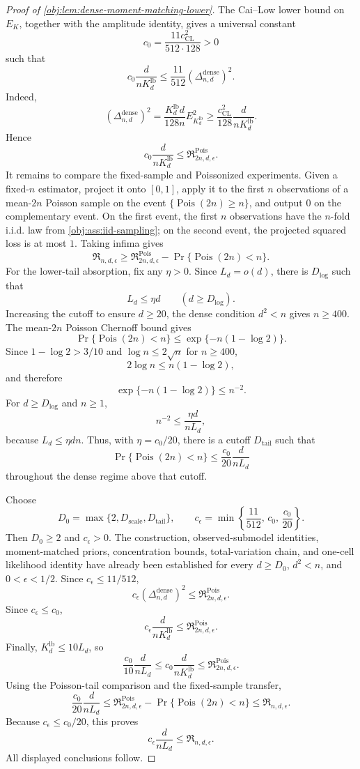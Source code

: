 \documentclass[11pt]{article}
\begin{document}
\begin{proof}[Proof of \cref{obj:lem:dense-moment-matching-lower}]
The Cai--Low lower bound on \(E_K\), together with the amplitude identity, gives a universal constant
\[
c_0=\frac{11c_{\mathrm{CL}}^2}{512\cdot128}>0
\]
such that
\[
c_0\frac{d}{nK_d^{\mathrm{lb}}}
\le
\frac{11}{512}(\Delta_{n,d}^{\mathrm{dense}})^2.
\]
Indeed,
\[
(\Delta_{n,d}^{\mathrm{dense}})^2
=
\frac{K_d^{\mathrm{lb}}d}{128n}E_{K_d^{\mathrm{lb}}}^2
\ge
\frac{c_{\mathrm{CL}}^2}{128}\frac{d}{nK_d^{\mathrm{lb}}}.
\]
Hence
\[
c_0\frac{d}{nK_d^{\mathrm{lb}}}
\le
\mathfrak R^{\mathrm{Pois}}_{2n,d,\epsilon}.
\]
It remains to compare the fixed-sample and Poissonized experiments. Given a fixed-\(n\) estimator, project it onto \([0,1]\), apply it to the first \(n\) observations of a mean-\(2n\) Poisson sample on the event \(\{\operatorname{Pois}(2n)\ge n\}\), and output \(0\) on the complementary event. On the first event, the first \(n\) observations have the \(n\)-fold i.i.d. law from \cref{obj:ass:iid-sampling}; on the second event, the projected squared loss is at most \(1\). Taking infima gives
\[
\mathfrak R_{n,d,\epsilon}
\ge
\mathfrak R^{\mathrm{Pois}}_{2n,d,\epsilon}
-
\Pr\{\operatorname{Pois}(2n)<n\}.
\]
For the lower-tail absorption, fix any \(\eta>0\). Since \(L_d=o(d)\), there is \(D_{\log}\) such that
\[
L_d\le \eta d
\qquad(d\ge D_{\log}).
\]
Increasing the cutoff to ensure \(d\ge20\), the dense condition \(d^2<n\) gives \(n\ge400\). The mean-\(2n\) Poisson Chernoff bound gives
\[
\Pr\{\operatorname{Pois}(2n)<n\}
\le
\exp\{-n(1-\log2)\}.
\]
Since \(1-\log2>3/10\) and \(\log n\le2\sqrt n\) for \(n\ge400\),
\[
2\log n\le n(1-\log2),
\]
and therefore
\[
\exp\{-n(1-\log2)\}\le n^{-2}.
\]
For \(d\ge D_{\log}\) and \(n\ge1\),
\[
n^{-2}\le \frac{\eta d}{nL_d},
\]
because \(L_d\le \eta dn\). Thus, with \(\eta=c_0/20\), there is a cutoff \(D_{\mathrm{tail}}\) such that
\[
\Pr\{\operatorname{Pois}(2n)<n\}
\le
\frac{c_0}{20}\frac{d}{nL_d}
\]
throughout the dense regime above that cutoff.

Choose
\[
D_0=\max\{2,D_{\mathrm{scale}},D_{\mathrm{tail}}\},
\qquad
c_\epsilon=\min\left\{\frac{11}{512},\,c_0,\,\frac{c_0}{20}\right\}.
\]
Then \(D_0\ge2\) and \(c_\epsilon>0\). The construction, observed-submodel identities, moment-matched priors, concentration bounds, total-variation chain, and one-cell likelihood identity have already been established for every \(d\ge D_0\), \(d^2<n\), and \(0<\epsilon<1/2\). Since \(c_\epsilon\le11/512\),
\[
c_\epsilon(\Delta_{n,d}^{\mathrm{dense}})^2
\le
\mathfrak R^{\mathrm{Pois}}_{2n,d,\epsilon}.
\]
Since \(c_\epsilon\le c_0\),
\[
c_\epsilon\frac{d}{nK_d^{\mathrm{lb}}}
\le
\mathfrak R^{\mathrm{Pois}}_{2n,d,\epsilon}.
\]
Finally, \(K_d^{\mathrm{lb}}\le10L_d\), so
\[
\frac{c_0}{10}\frac{d}{nL_d}
\le
c_0\frac{d}{nK_d^{\mathrm{lb}}}
\le
\mathfrak R^{\mathrm{Pois}}_{2n,d,\epsilon}.
\]
Using the Poisson-tail comparison and the fixed-sample transfer,
\[
\frac{c_0}{20}\frac{d}{nL_d}
\le
\mathfrak R^{\mathrm{Pois}}_{2n,d,\epsilon}
-
\Pr\{\operatorname{Pois}(2n)<n\}
\le
\mathfrak R_{n,d,\epsilon}.
\]
Because \(c_\epsilon\le c_0/20\), this proves
\[
c_\epsilon\frac{d}{nL_d}
\le
\mathfrak R_{n,d,\epsilon}.
\]
All displayed conclusions follow.
\end{proof}
\end{document}
